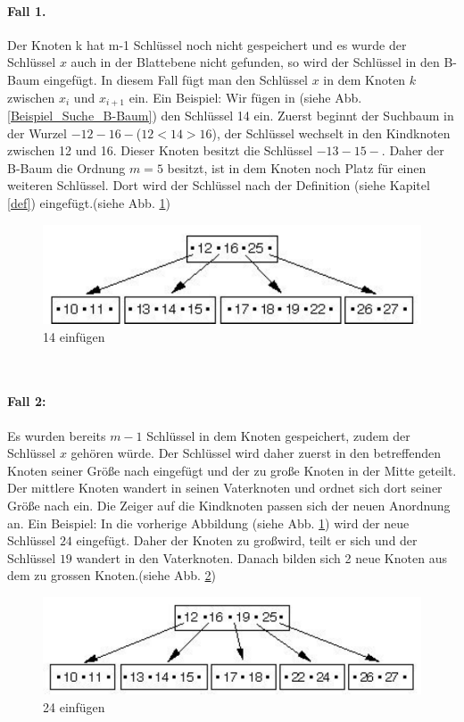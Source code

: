 \paragraph{Fall 1.}
Der Knoten k hat m-1 Schl\"ussel noch nicht gespeichert und es wurde der Schl\"ussel $x$ auch in der Blattebene nicht gefunden, so wird der Schl\"ussel in den B-Baum eingef\"ugt. In diesem Fall f\"ugt man den Schl\"ussel $x$ in dem Knoten $k$ zwischen $x_{i}$ und $ x_{i+1} $ ein.
\newline
Ein Beispiel:
\newline
Wir f\"ugen in (siehe Abb. \ref{Beispiel_Suche_B-Baum})  den Schl\"ussel 14 ein. Zuerst beginnt der Suchbaum in der Wurzel $-12-16-$($12<14>16$), der Schl\"ussel wechselt in den Kindknoten zwischen 12 und 16. Dieser Knoten besitzt die Schl\"ussel $-13-15-$. Daher der B-Baum die Ordnung $m=5$ besitzt, ist in dem Knoten noch Platz f\"ur einen weiteren Schl\"ussel. Dort wird der Schl\"ussel nach der Definition (siehe Kapitel \ref{def}) eingef\"ugt.(siehe Abb. \ref{insert_01}) 
\\[0.5in]
\begin{figure}[h!] %
\centering
\includegraphics[width=0.7\linewidth]{images/insert_01}
\caption{14 einf\"ugen}
\label{insert_01}
\end{figure}
\\[0.3in]
\paragraph{Fall 2:}
Es wurden bereits $m-1$ Schl\"ussel in dem Knoten gespeichert, zudem der Schl\"ussel $x$ geh\"oren w\"urde. Der Schl\"ussel wird daher zuerst in den betreffenden Knoten seiner Gr\"o\ss e nach eingef\"ugt und der zu gro\ss e Knoten in der Mitte geteilt. Der mittlere Knoten wandert in seinen Vaterknoten und ordnet sich dort seiner Gr\"o\ss e nach ein. Die Zeiger auf die Kindknoten passen sich der neuen Anordnung an.
\newline
Ein Beispiel:
\newline
In die vorherige Abbildung (siehe Abb. \ref{insert_01}) wird der neue Schl\"ussel $24$ eingef\"ugt. Daher der Knoten zu gro\ss  wird, teilt er sich und der Schl\"ussel $19$ wandert in den Vaterknoten. Danach bilden sich 2 neue Knoten aus dem zu gross{}en Knoten.(siehe Abb. \ref{insert_02})
\\[0.5in]
\begin{figure}[h!] %
	\centering
	\includegraphics[width=0.7\linewidth]{images/insert_02}
	\caption{24 einf\"ugen}
	\label{insert_02}
\end{figure}
\newpage
